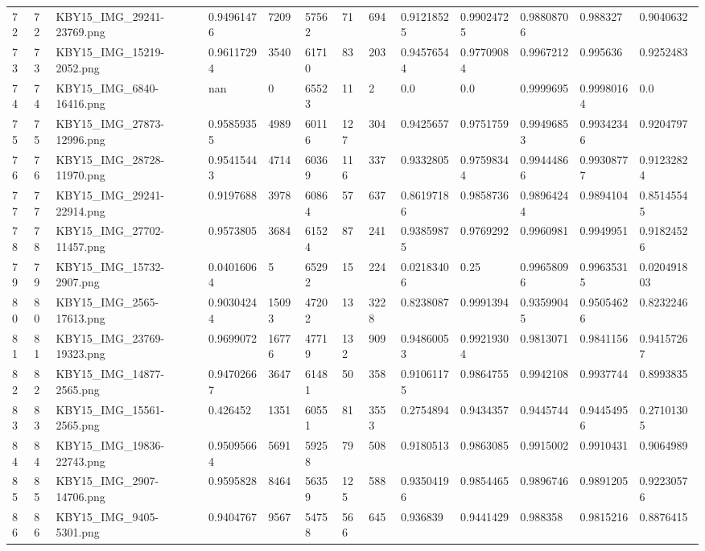 \documentclass[11pt, a4paper, twoside]{report}
\begin{document}
\begin{longtable}[c]{@{}lllllllllllll@{}}
72 & 72 & KBY15\_IMG\_29241-23769.png & 0.94961476 & 7209 & 57562 & 71 & 694 & 0.91218525 & 0.99024725 & 0.98808706 & 0.988327 & 0.9040632 \\
73 & 73 & KBY15\_IMG\_15219-2052.png & 0.96117294 & 3540 & 61710 & 83 & 203 & 0.94576544 & 0.97709084 & 0.9967212 & 0.995636 & 0.9252483 \\
74 & 74 & KBY15\_IMG\_6840-16416.png & nan & 0 & 65523 & 11 & 2 & 0.0 & 0.0 & 0.9999695 & 0.99980164 & 0.0 \\
75 & 75 & KBY15\_IMG\_27873-12996.png & 0.95859355 & 4989 & 60116 & 127 & 304 & 0.9425657 & 0.9751759 & 0.99496853 & 0.99342346 & 0.9204797 \\
76 & 76 & KBY15\_IMG\_28728-11970.png & 0.95415443 & 4714 & 60369 & 116 & 337 & 0.9332805 & 0.97598344 & 0.99444866 & 0.99308777 & 0.91232824 \\
77 & 77 & KBY15\_IMG\_29241-22914.png & 0.9197688 & 3978 & 60864 & 57 & 637 & 0.86197186 & 0.9858736 & 0.98964244 & 0.9894104 & 0.85145545 \\
78 & 78 & KBY15\_IMG\_27702-11457.png & 0.9573805 & 3684 & 61524 & 87 & 241 & 0.93859875 & 0.9769292 & 0.9960981 & 0.9949951 & 0.91824526 \\
79 & 79 & KBY15\_IMG\_15732-2907.png & 0.04016064 & 5 & 65292 & 15 & 224 & 0.02183406 & 0.25 & 0.99658096 & 0.99635315 & 0.020491803 \\
80 & 80 & KBY15\_IMG\_2565-17613.png & 0.90304244 & 15093 & 47202 & 13 & 3228 & 0.8238087 & 0.9991394 & 0.93599045 & 0.95054626 & 0.8232246 \\
81 & 81 & KBY15\_IMG\_23769-19323.png & 0.9699072 & 16776 & 47719 & 132 & 909 & 0.94860053 & 0.99219304 & 0.9813071 & 0.9841156 & 0.94157267 \\
82 & 82 & KBY15\_IMG\_14877-2565.png & 0.94702667 & 3647 & 61481 & 50 & 358 & 0.91061175 & 0.9864755 & 0.9942108 & 0.9937744 & 0.8993835 \\
83 & 83 & KBY15\_IMG\_15561-2565.png & 0.426452 & 1351 & 60551 & 81 & 3553 & 0.2754894 & 0.9434357 & 0.9445744 & 0.94454956 & 0.27101305 \\
84 & 84 & KBY15\_IMG\_19836-22743.png & 0.95095664 & 5691 & 59258 & 79 & 508 & 0.9180513 & 0.9863085 & 0.9915002 & 0.9910431 & 0.9064989 \\
85 & 85 & KBY15\_IMG\_2907-14706.png & 0.9595828 & 8464 & 56359 & 125 & 588 & 0.93504196 & 0.9854465 & 0.9896746 & 0.9891205 & 0.92230576 \\
86 & 86 & KBY15\_IMG\_9405-5301.png & 0.9404767 & 9567 & 54758 & 566 & 645 & 0.936839 & 0.9441429 & 0.988358 & 0.9815216 & 0.8876415 \\

\end{longtable}
\end{document}
